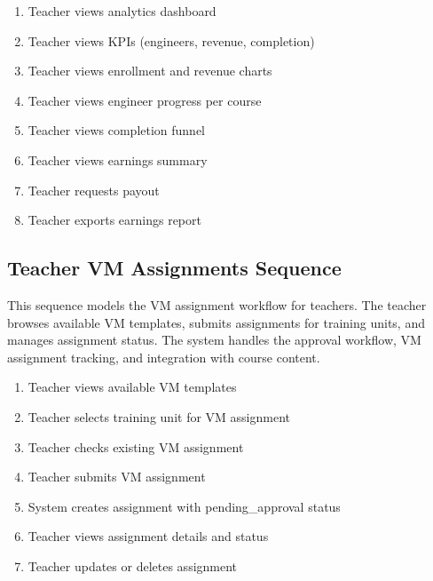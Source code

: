 \begin{enumerate}[topsep=0pt,itemsep=1pt,parsep=0pt,partopsep=0pt]
    \item Teacher views analytics dashboard
    \item Teacher views KPIs (engineers, revenue, completion)
    \item Teacher views enrollment and revenue charts
    \item Teacher views engineer progress per course
    \item Teacher views completion funnel
    \item Teacher views earnings summary
    \item Teacher requests payout
    \item Teacher exports earnings report
\end{enumerate}


\subsection{Teacher VM Assignments Sequence}
This sequence models the VM assignment workflow for teachers. The teacher
browses available VM templates, submits assignments for training units, and
manages assignment status. The system handles the approval workflow, VM
assignment tracking, and integration with course content.

\begin{enumerate}[topsep=0pt,itemsep=1pt,parsep=0pt,partopsep=0pt]
    \item Teacher views available VM templates
    \item Teacher selects training unit for VM assignment
    \item Teacher checks existing VM assignment
    \item Teacher submits VM assignment
    \item System creates assignment with pending\_approval status
    \item Teacher views assignment details and status
    \item Teacher updates or deletes assignment
\end{enumerate}


